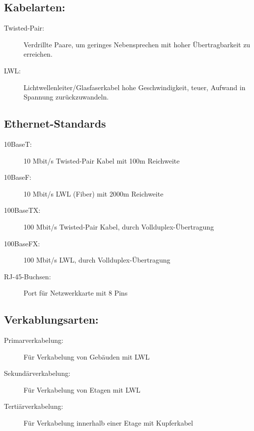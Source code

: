 \documentclass[12pt,a4paper]{article}
\begin{document}
		\subsection{Kabelarten:}
		\begin{description}
			\item[Twisted-Pair: ] Verdrillte Paare, um geringes Nebensprechen mit hoher Übertragbarkeit zu erreichen.
			\item[LWL: ] Lichtwellenleiter/Glasfaserkabel hohe Geschwindigkeit, teuer, Aufwand in Spannung zurückzuwandeln.  
		\end{description}

		\subsection{Ethernet-Standards}
		\begin{description}
			\item[10BaseT: ] 10 Mbit/s Twisted-Pair Kabel mit 100m Reichweite
			\item[10BaseF: ] 10 Mbit/s LWL (Fiber) mit 2000m Reichweite 
			\item[100BaseTX: ] 100 Mbit/s Twisted-Pair Kabel, durch Vollduplex-Übertragung
			\item[100BaseFX: ]  100 Mbit/s LWL, durch Vollduplex-Übertragung
			\item[RJ-45-Buchsen: ] Port für Netzwerkkarte mit 8 Pins
		\end{description}

		\subsection{Verkablungsarten:}
		\begin{description}
			\item[Primarverkabelung: ] Für Verkabelung von Gebäuden mit LWL
			\item[Sekundärverkabelung: ] Für Verkabelung von Etagen mit LWL
			\item[Tertiärverkabelung: ] Für Verkabelung innerhalb einer Etage mit Kupferkabel
		\end{description}
	
\end{document}
